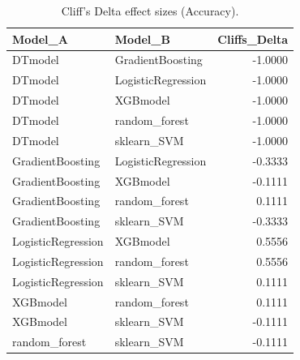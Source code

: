 \begin{table}[t]
\centering
\begin{tabular}{llr}
\toprule
Model_A & Model_B & Cliffs_Delta \\
\midrule
DTmodel & GradientBoosting & -1.0000 \\
DTmodel & LogisticRegression & -1.0000 \\
DTmodel & XGBmodel & -1.0000 \\
DTmodel & random_forest & -1.0000 \\
DTmodel & sklearn_SVM & -1.0000 \\
GradientBoosting & LogisticRegression & -0.3333 \\
GradientBoosting & XGBmodel & -0.1111 \\
GradientBoosting & random_forest & 0.1111 \\
GradientBoosting & sklearn_SVM & -0.3333 \\
LogisticRegression & XGBmodel & 0.5556 \\
LogisticRegression & random_forest & 0.5556 \\
LogisticRegression & sklearn_SVM & 0.1111 \\
XGBmodel & random_forest & 0.1111 \\
XGBmodel & sklearn_SVM & -0.1111 \\
random_forest & sklearn_SVM & -0.1111 \\
\bottomrule
\end{tabular}
\caption{Cliff's Delta effect sizes (Accuracy).}
\label{tab:cliffs_Accuracy}
\end{table}